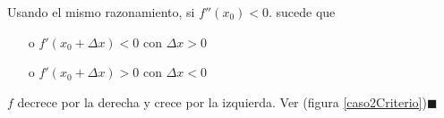 \documentclass[10pt,twoside]{SelfArx} %
\begin{document}
\begin{figure}[h]\label{casoCriterio}
	\centering
	
	\caption{}
\end{figure}
Usando el mismo     razonamiento, si $ f''(x_{0})<0 $.
    sucede que 
    \begin{enumerate}
    	\item[o] $ f'(x_{0}+\Delta x)<0 $ con $ \Delta x>0 $
    	\item[o] $ f'(x_{0}+\Delta x)>0 $ con $ \Delta x<0 $
    \end{enumerate}
    $ f $ decrece por la derecha y crece por la izquierda. Ver (figura \ref{caso2Criterio})$ \blacksquare $
\end{document}
